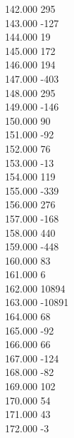 { 142.000	295 \\
 143.000	-127 \\
 144.000	19 \\
 145.000	172 \\
 146.000	194 \\
 147.000	-403 \\
 148.000	295 \\
 149.000	-146 \\
 150.000	90 \\
 151.000	-92 \\
 152.000	76 \\
 153.000	-13 \\
 154.000	119 \\
 155.000	-339 \\
 156.000	276 \\
 157.000	-168 \\
 158.000	440 \\
 159.000	-448 \\
 160.000	83 \\
 161.000	6 \\
 162.000	10894 \\
 163.000	-10891 \\
 164.000	68 \\
 165.000	-92 \\
 166.000	66 \\
 167.000	-124 \\
 168.000	-82 \\
 169.000	102 \\
 170.000	54 \\
 171.000	43 \\
 172.000	-3 \\
}
